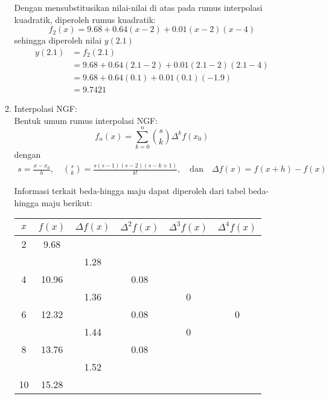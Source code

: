 \documentclass{article}
\begin{document}
\begin{enumerate}
\begin{enumerate}
        Dengan mensubstitusikan nilai-nilai di atas pada rumus interpolasi kuadratik, diperoleh rumus kuadratik:
        \begin{equation*}
            f_2(x) = \num{9,68} + \num{0,64}(x - 2) + \num{0,01}(x - 2)(x - 4)
        \end{equation*}
        sehingga diperoleh nilai $y(\num{2,1})$
        \begin{align*}
            y(\num{2,1}) &= f_2(\num{2,1}) \\
            &= \num{9,68} + \num{0,64}(\num{2,1} - 2) + \num{0,01}(\num{2,1} - 2)(\num{2,1} - 4) \\
            &= \num{9,68} + \num{0,64}(\num{0,1}) + \num{0,01}(\num{0,1})(-\num{1,9}) \\
            &= \num{9,7421}
        \end{align*}

        \item Interpolasi NGF: \\
        Bentuk umum rumus interpolasi NGF:
        \begin{equation*}
            f_n(x) = \sum_{k=0}^{n} \binom{s}{k} \Delta^k f(x_0)
        \end{equation*}
        dengan
        \begin{align*}
            s = \frac{x - x_0}{h}, \quad
            \binom{s}{k} = \frac{s(s - 1)(s - 2)(s - k + 1)}{k!}, \quad \text{dan} \quad \Delta f(x) = f(x+h) - f(x)
        \end{align*}

        Informasi terkait beda-hingga maju dapat diperoleh dari tabel beda-hingga maju berikut: \\
        \begin{tabular}{c c c c c c}
        $x$ & $f(x)$ & $\Delta f(x)$ & $\Delta^2 f(x)$ & $\Delta^3 f(x)$ & $\Delta^4 f(x)$ \\
        \hline
        2  & \num{9,68}  &            &             &           &      \\
           &             & \num{1,28} &             &           &      \\
        4  & \num{10,96} &            & \num{0,08}  &           &      \\
           &             & \num{1,36} &             & 0 &      \\
        6  & \num{12,32} &            & \num{0,08}  &           & 0 \\
           &             & \num{1,44} &             & 0 &      \\
        8  & \num{13,76} &            & \num{0,08}  &           &      \\
           &             & \num{1,52} &             &           &      \\
        10 & \num{15,28} &            &             &           &      \\
        \end{tabular} \\


\end{enumerate}
\end{enumerate}
\end{document}
